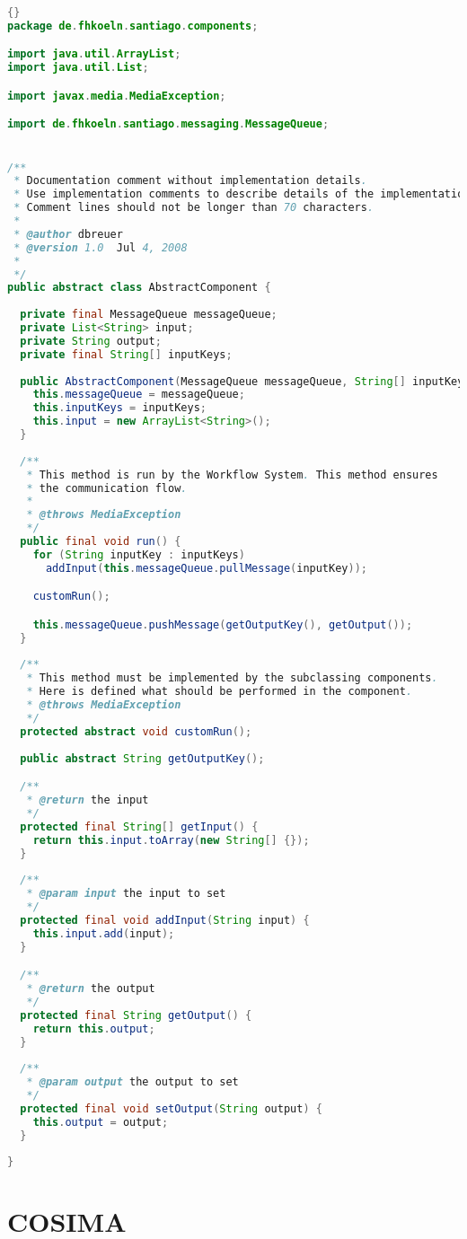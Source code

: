 \begin{lstlisting}[caption=\texttt{AbstractComponent} Klasse,label=lst:abstract_component_klasse,language=Java]{}
package de.fhkoeln.santiago.components;

import java.util.ArrayList;
import java.util.List;

import javax.media.MediaException;

import de.fhkoeln.santiago.messaging.MessageQueue;


/**
 * Documentation comment without implementation details. 
 * Use implementation comments to describe details of the implementation.
 * Comment lines should not be longer than 70 characters.
 *
 * @author dbreuer
 * @version 1.0  Jul 4, 2008
 *
 */
public abstract class AbstractComponent {
  
  private final MessageQueue messageQueue;
  private List<String> input;
  private String output;
  private final String[] inputKeys;
  
  public AbstractComponent(MessageQueue messageQueue, String[] inputKeys) {
    this.messageQueue = messageQueue;
    this.inputKeys = inputKeys;
    this.input = new ArrayList<String>();
  }
  
  /**
   * This method is run by the Workflow System. This method ensures
   * the communication flow.
   * 
   * @throws MediaException
   */
  public final void run() {
    for (String inputKey : inputKeys)
      addInput(this.messageQueue.pullMessage(inputKey));

    customRun();

    this.messageQueue.pushMessage(getOutputKey(), getOutput());
  }
  
  /**
   * This method must be implemented by the subclassing components.
   * Here is defined what should be performed in the component.
   * @throws MediaException 
   */
  protected abstract void customRun();
  
  public abstract String getOutputKey();

  /**
   * @return the input
   */
  protected final String[] getInput() {
    return this.input.toArray(new String[] {});
  }
  
  /**
   * @param input the input to set
   */
  protected final void addInput(String input) {
    this.input.add(input);
  }

  /**
   * @return the output
   */
  protected final String getOutput() {
    return this.output;
  }
  
  /**
   * @param output the output to set
   */
  protected final void setOutput(String output) {
    this.output = output;
  }
  
}
\end{lstlisting}


\section{COSIMA} %
\label{sec:cosima_architektur}


